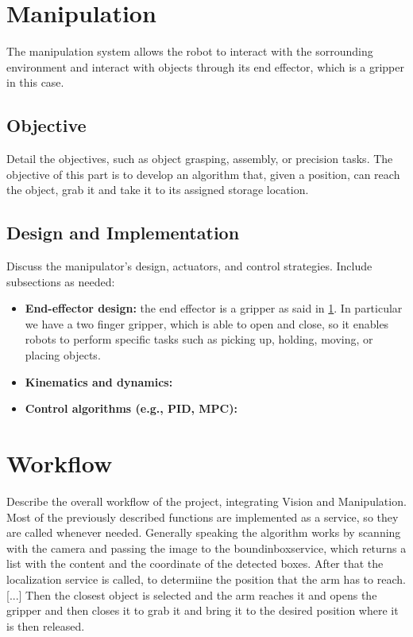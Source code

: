 \documentclass[12pt,a4paper]{article}
\begin{document}
\section{Manipulation}\label{sec:manipulation}
The manipulation system allows the robot to interact with the sorrounding environment and interact with objects through its end effector, which is a gripper in this case.

\subsection{Objective}\label{subsec:mobj}
Detail the objectives, such as object grasping, assembly, or precision tasks.
The objective of this part is to develop an algorithm that, given a position, can reach the object, grab it and take it to its assigned storage location.

\subsection{Design and Implementation}\label{susec:design}
Discuss the manipulator's design, actuators, and control strategies. Include subsections as needed:
\begin{itemize}
    \item \textbf{End-effector design:} the end effector is a gripper as said in \ref{sec:manipulation}. In particular we have a two finger gripper, which is able to open and close, so it enables robots to perform specific tasks such as picking up, holding, moving, or placing objects. 
    \item \textbf{Kinematics and dynamics:}
    \item \textbf{Control algorithms (e.g., PID, MPC):}
\end{itemize}



\section{Workflow}\label{sec:workflow}
Describe the overall workflow of the project, integrating Vision and Manipulation. Most of the previously described functions are implemented as a service, so they are called whenever needed. Generally speaking the algorithm works by scanning with the camera and passing the image to the boundinboxservice, which returns a list with the content and the coordinate of the detected boxes. After that the localization service is called, to determiine the position that the arm has to reach. [...] Then the closest object is selected and the arm reaches it and opens the gripper and then closes it to grab it and bring it to the desired position where it is then released.
\end{document}
